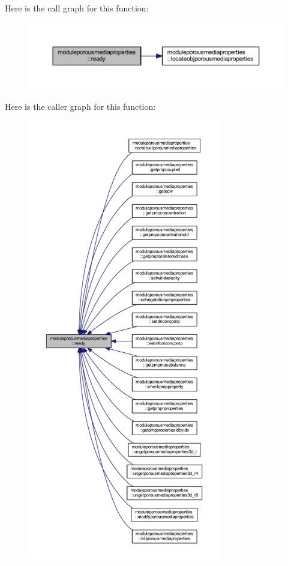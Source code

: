Here is the call graph for this function\+:\nopagebreak
\begin{figure}[H]
\begin{center}
\leavevmode
\includegraphics[width=350pt]{namespacemoduleporousmediaproperties_a1a2026bd74e611727f9dca5173548d05_cgraph}
\end{center}
\end{figure}
Here is the caller graph for this function\+:\nopagebreak
\begin{figure}[H]
\begin{center}
\leavevmode
\includegraphics[height=550pt]{namespacemoduleporousmediaproperties_a1a2026bd74e611727f9dca5173548d05_icgraph}
\end{center}
\end{figure}
\mbox{\label{namespacemoduleporousmediaproperties_afc91dc82442179a1d26d776a3a1007d6}} 
